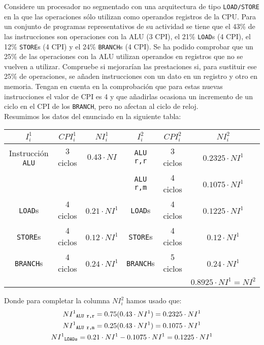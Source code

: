 \begin{ejercicio} \label{ej:1.5}
    Considere un procesador no segmentado con una arquitectura de tipo \verb|LOAD/STORE| en la que las
    operaciones sólo utilizan como operandos registros de la CPU. Para un conjunto de programas
    representativos de su actividad se tiene que el 43\% de las instrucciones son operaciones con la ALU (3 CPI),
    el 21\% \verb|LOAD|s (4 CPI), el 12\% \verb|STORE|s (4 CPI) y el 24\% \verb|BRANCH|s (4 CPI).
    Se ha podido comprobar que un 25\% de las operaciones con la ALU utilizan operandos en registros que no se
    vuelven a utilizar. Compruebe si mejorarían las prestaciones si, para sustituir ese 25\% de operaciones, se
    añaden instrucciones con un dato en un registro y otro en memoria. Tengan en cuenta en la comprobación que para estas nuevas instrucciones el valor de CPI es 4 y que añadirlas ocasiona un incremento de un ciclo
    en el CPI de los \verb|BRANCH|, pero no afectan al ciclo de reloj.\\

    Resumimos los datos del enunciado en la siguiente tabla:
    \begin{table}[H]
        \centering
        \begin{tabular}{c|c|c|c|c|c}
            $I_i^1$ & $CPI_i^1$ & $NI_i^1$ & $I_i^2$ & $CPI_i^2$ & $NI_i^2$ \\
            \hline
            Instrucción \verb|ALU| & 3 ciclos & $0.43 \cdot NI$ & \verb|ALU r,r| & 3 ciclos & $0.2325 \cdot NI^1$ \\
                            & & & \verb|ALU r,m| & 4 ciclos &  $ 0.1075 \cdot NI^1$ \\
            \verb|LOAD|s & 4 ciclos & $0.21 \cdot NI^1$ & \verb|LOAD|s & 4 ciclos & $0.1225 \cdot NI^1$ \\
            \verb|STORE|s & 4 ciclos & $0.12 \cdot NI^1$ & \verb|STORE|s & 4 ciclos & $0.12 \cdot NI^1$ \\
            \verb|BRANCH|s & 4 ciclos & $0.24 \cdot NI^1$ & \verb|BRANCH|s & 5 ciclos & $0.24 \cdot NI^1$  \\
            \hline
                           & & & & & $0.8925\cdot NI^1 = NI^2$ \\
        \end{tabular}
    \end{table}

    Donde para completar la columna $NI_i^2$ hamos usado que:
    \begin{gather*}
        NI^1{\sb\texttt{ALU r,r}} = 0.75(0.43\cdot NI^1) = 0.2325 \cdot NI^1\\
        NI^1{\sb\texttt{ALU r,m}} = 0.25 (0.43 \cdot NI^1) = 0.1075\cdot NI^1\\
        NI^1{\sb\texttt{LOADs}} = 0.21 \cdot NI^1-0.1075\cdot NI^1 = 0.1225 \cdot NI^1
    \end{gather*}


\end{ejercicio}
